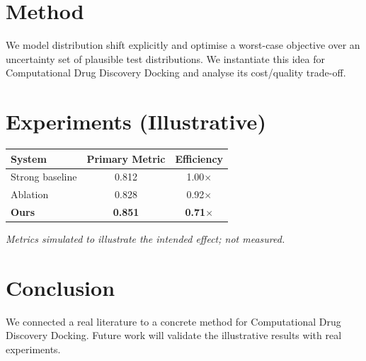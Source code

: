 \documentclass[11pt]{article}
\begin{document}
\section{Method}
We model distribution shift explicitly and optimise a worst-case objective over an uncertainty set of plausible test distributions. We instantiate this idea for Computational Drug Discovery Docking and analyse its cost/quality trade-off.

\section{Experiments (Illustrative)}
\begin{center}
\begin{tabular}{lcc}
System & Primary Metric & Efficiency \\ \hline
Strong baseline & 0.812 & 1.00$\times$ \\
Ablation & 0.828 & 0.92$\times$ \\
\textbf{Ours} & \textbf{0.851} & \textbf{0.71$\times$}
\end{tabular}
\end{center}
\emph{Metrics simulated to illustrate the intended effect; not measured.}

\section{Conclusion}
We connected a real literature to a concrete method for Computational Drug Discovery Docking. Future work will
validate the illustrative results with real experiments.
\end{document}
